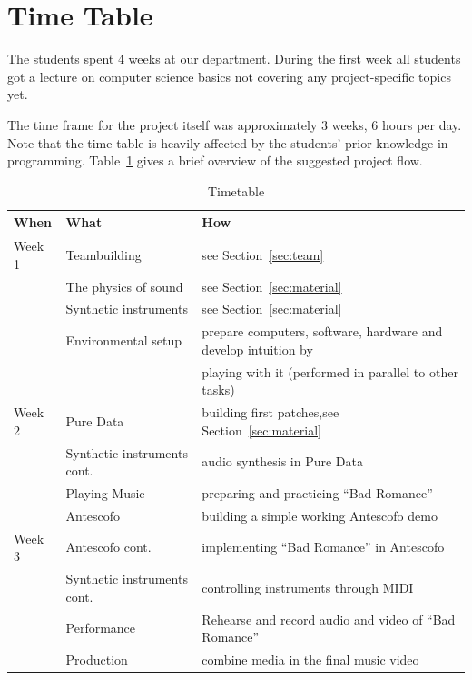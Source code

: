\documentclass[onecolumn,nocopyrightspace,preprint]{sigplanconf}
\begin{document}
\section{Time Table}

The students spent 4 weeks at our department. During the first week all students
got a lecture on computer science basics not covering any project-specific topics yet.

The time frame for the project itself was approximately 3 weeks, 6 hours per day.
Note that the time table is heavily affected by the students' prior
knowledge in programming. Table~\ref{tab:time} gives a brief overview of the
suggested project flow.

\begin{table}
\centering
\begin{tabular}{l|ll}
When              & What  & How  \\
\hline
Week 1            & Teambuilding          & see Section~\ref{sec:team} \\
                  & The physics of sound  & see Section~\ref{sec:material} \\
                  & Synthetic instruments & see Section~\ref{sec:material} \\
                  & Environmental setup   & prepare computers, software, hardware and develop intuition by 
                  \\
                  &  & playing with it (performed in parallel to other tasks)  \\
Week 2            & Pure Data             & building first patches,see Section~\ref{sec:material} \\
                  & Synthetic instruments cont. & audio synthesis in Pure Data \\
                  & Playing Music   & preparing and practicing ``Bad Romance'' \\
                  & Antescofo & building a simple working Antescofo demo \\
Week 3            & Antescofo cont. & implementing ``Bad Romance'' in Antescofo \\
                  & Synthetic instruments cont.  & controlling instruments through MIDI \\
                  & Performance   & Rehearse and record audio and video of ``Bad Romance'' \\
                  & Production   & combine media in the final music video \\
\end{tabular}
\caption{Timetable}
\label{tab:time}
\end{table}
\end{document}
